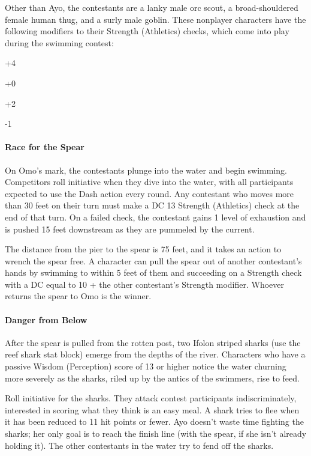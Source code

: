 \documentclass[10pt,a4paper,twoside,bg=print,twocolumn,openany,nodeprecatedcode]{dndbook}
\begin{document}
Other than Ayo, the contestants are a lanky male orc scout, a broad-shouldered female human thug, and a surly male goblin. These nonplayer characters have the following modifiers to their Strength (Athletics) checks, which come into play during the swimming contest:


\begin{description}[nolistsep]
\item[Ayo Jabe:]
+4
\item[Male Orc:]
+0
\item[Female Human:]
+2
\item[Male Goblin:]
-1
\end{description}

\paragraph{Race for the Spear}
On Omo's mark, the contestants plunge into the water and begin swimming. Competitors roll initiative when they dive into the water, with all participants expected to use the Dash action every round. Any contestant who moves more than 30 feet on their turn must make a DC 13 Strength (Athletics) check at the end of that turn. On a failed check, the contestant gains 1 level of exhaustion and is pushed 15 feet downstream as they are pummeled by the current.

The distance from the pier to the spear is 75 feet, and it takes an action to wrench the spear free. A character can pull the spear out of another contestant's hands by swimming to within 5 feet of them and succeeding on a Strength check with a DC equal to 10 + the other contestant's Strength modifier. Whoever returns the spear to Omo is the winner.

\paragraph{Danger from Below}
After the spear is pulled from the rotten post, two Ifolon striped sharks (use the reef shark stat block) emerge from the depths of the river. Characters who have a passive Wisdom (Perception) score of 13 or higher notice the water churning more severely as the sharks, riled up by the antics of the swimmers, rise to feed.

Roll initiative for the sharks. They attack contest participants indiscriminately, interested in scoring what they think is an easy meal. A shark tries to flee when it has been reduced to 11 hit points or fewer. Ayo doesn't waste time fighting the sharks; her only goal is to reach the finish line (with the spear, if she isn't already holding it). The other contestants in the water try to fend off the sharks.
\end{document}
